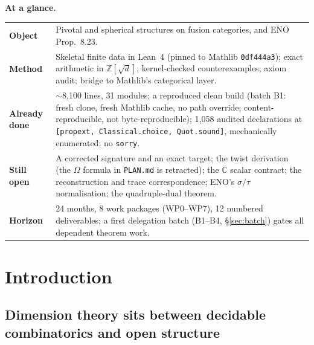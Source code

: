 \documentclass[11pt,a4paper]{article}
\theoremstyle{remark}
\newcommand{\Cx}{\mathbb{C}}
\newcommand{\Z}{\mathbb{Z}}
\begin{document}
\vspace{0.2cm}

\begin{center}
\begin{minipage}{0.94\textwidth}
\colorbox{soft}{%
\begin{minipage}{0.92\textwidth}
\vspace{0.12cm}
\footnotesize
\textbf{At a glance.}\par\vspace{2pt}
\begin{tabularx}{\textwidth}{@{}lL@{}}
\textbf{Object} & Pivotal and spherical structures on fusion categories, and ENO Prop.~8.23.\\
\textbf{Method} & Skeletal finite data in Lean~4 (pinned to Mathlib \texttt{0df444a3}); exact arithmetic in
$\Z[\sqrt d]$; kernel-checked counterexamples; axiom audit; bridge to Mathlib's categorical layer.\\
\textbf{Already done} & $\sim$8{,}100 lines, 31 modules; a reproduced clean build (batch B1:
fresh clone, fresh Mathlib cache, no path override; content-reproducible, not
byte-reproducible); 1{,}058 audited declarations at
\texttt{[propext, Classical.choice, Quot.sound]}, mechanically enumerated; no \texttt{sorry}.\\
\textbf{Still open} & A corrected signature and an exact target; the twist derivation (the
$\Omega$ formula in \texttt{PLAN.md} is retracted); the $\Cx$ scalar contract; the reconstruction and
trace correspondence; ENO's $\sigma/\tau$ normalisation; the quadruple-dual theorem.\\
\textbf{Horizon} & 24 months, 8 work packages (WP0--WP7), 12 numbered deliverables; a first delegation
batch (B1--B4, \S\ref{sec:batch}) gates all dependent theorem work.\\
\end{tabularx}
\vspace{0.15cm}
\end{minipage}}
\end{minipage}
\end{center}

\newpage

{\footnotesize\tableofcontents}

\newpage

\section{Introduction}

\subsection{Dimension theory sits between decidable combinatorics and open structure}
\end{document}

